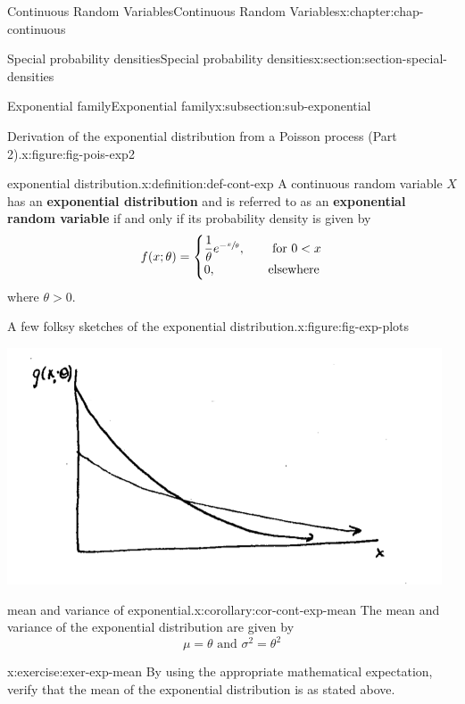 \documentclass[oneside,10pt,]{book}
\newcommand{\terminology}[1]{\textbf{#1}}
\numberwithin{equation}{section}
\newcommand{\lt}{<}
\newcommand{\gt}{>}
\newcommand{\amp}{&}
\begin{document}
\begin{chapterptx}{Continuous Random Variables}{}{Continuous Random Variables}{}{}{x:chapter:chap-continuous}
\begin{sectionptx}{Special probability densities}{}{Special probability densities}{}{}{x:section:section-special-densities}
\begin{subsectionptx}{Exponential family}{}{Exponential family}{}{}{x:subsection:sub-exponential}
\begin{figureptx}{Derivation of the exponential distribution from a Poisson process (Part 2).}{x:figure:fig-pois-exp2}{}
\begin{image}{0.1}{0.8}{0.1}
\end{image}%
\tcblower
\end{figureptx}%
\begin{definition}{exponential distribution.}{x:definition:def-cont-exp}%
A continuous random variable \(\displaystyle X\) has an \terminology{exponential distribution} and is referred to as an \terminology{exponential random variable} if and only if its probability density is given by%
\begin{equation*}
f(x; \theta) =
\begin{cases}\dfrac{1}{\theta}e^{-\sfrac{x}{\theta}}, \amp \quad \text{
for } 0 \lt x\\0, \amp \quad \text{elsewhere}\end{cases}
\end{equation*}
where \(\theta \gt 0\).%
\end{definition}
\begin{figureptx}{A few folksy sketches of the exponential distribution.}{x:figure:fig-exp-plots}{}%
\begin{image}{0.25}{0.5}{0.25}%
\includegraphics[width=\linewidth]{./images/exps.png}
\end{image}%
\tcblower
\end{figureptx}%
\begin{corollary}{mean and variance of exponential.}{}{x:corollary:cor-cont-exp-mean}%
The mean and variance of the exponential distribution are given by%
\begin{equation*}
\mu = \theta \text{ and }\sigma^2 = \theta^2
\end{equation*}
%
\end{corollary}
\begin{inlineexercise}{}{x:exercise:exer-exp-mean}%
By using the appropriate mathematical expectation, verify that the mean of the exponential distribution is as stated above.%

\end{inlineexercise}
\end{subsectionptx}
\end{sectionptx}
\end{chapterptx}
\end{document}
